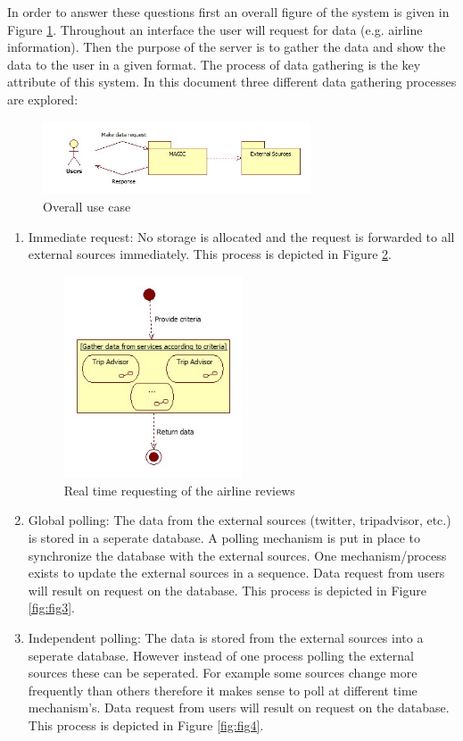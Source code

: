\documentclass{article}
\begin{document}
In order to answer these questions first an overall figure of the system is given in Figure \ref{fig:fig1}. 
Throughout an interface the user will request for data (e.g. airline information). Then the purpose of the server is to gather
the data and show the data to the user in a given format. The process of data gathering is the key attribute of this system.
In this document three different data gathering processes are explored:

\begin{figure}[!]
\centering
\includegraphics[width=300px]{UserRequestingData}
\caption{Overall use case}
\label{fig:fig1}
\end{figure}

\begin{enumerate}
\item Immediate request: No storage is allocated and the request is forwarded to all external sources immediately. This process is depicted in Figure \ref{fig:fig2}.  

\begin{figure}[!htbp]
\centering
\includegraphics[width=200px]{Realtime}
\caption{Real time requesting of the airline reviews}
\label{fig:fig2}
\end{figure}

\item Global polling: The data from the external sources (twitter, tripadvisor, etc.) is stored in a seperate database. A polling mechanism is put in place to synchronize the database with the external sources. One mechanism/process exists to update the external sources in a sequence. Data request from users will result on request on the database. This process is depicted in Figure \ref{fig:fig3}.  
\item Independent polling: The data is stored from the external sources into a
seperate database. However instead of one process polling the external sources
these can be seperated. For example some sources change more frequently than
others therefore it makes sense to poll at different time mechanism's. Data
request from users will result on request on the database. This process is
depicted in Figure \ref{fig:fig4}.  
\end{enumerate}
\end{document}
